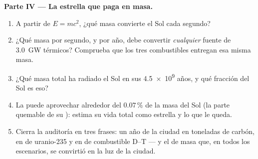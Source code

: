 \begin{problem}
\medskip
\noindent\textbf{Parte IV --- La estrella que paga en masa.}
\begin{enumerate}[resume]
  \item A partir de $E = mc^2$, ¿qué masa convierte el Sol cada segundo?
  \item ¿Qué masa por segundo, y por año, debe convertir \emph{cualquier} fuente de
        \qty{3.0}{GW} térmicos? Comprueba que los tres combustibles entregan esa misma
        masa.
  \item ¿Qué masa total ha radiado el Sol en sus \num{4.5e9} años, y qué fracción del
        Sol es eso?
  \item La  puede aprovechar alrededor del $0.07\,\%$ de la masa del Sol (la
        parte quemable de su ): estima su vida total como estrella y lo que le
        queda.
  \item Cierra la auditoría en tres frases: un año de la ciudad en toneladas de
        carbón, en  de uranio-235 y en  de combustible D--T --- y
        el  de masa que, en todos los escenarios, se convirtió en la luz de
        la ciudad.
\end{enumerate}
\end{problem}
